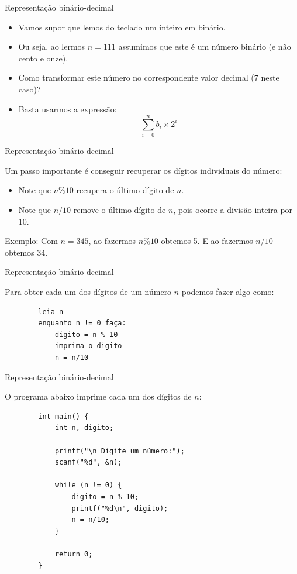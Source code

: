 \documentclass[handout]{beamer}
\begin{document}
\begin{frame}[fragile]{Representação binário-decimal}
    
    \begin{itemize}
        \item Vamos supor que lemos do teclado um inteiro em binário.
        \item Ou seja, ao lermos $n=111$ assumimos que este é um número binário (e não cento e onze).
        \item Como transformar este número no correspondente valor decimal (7 neste caso)?
        \item Basta usarmos a expressão:
            $$\sum_{i=0}^n b_i \times 2^i $$
    \end{itemize}
\end{frame}

\begin{frame}[fragile]{Representação binário-decimal}
    
    Um passo importante é conseguir recuperar os dígitos individuais do número:

    \begin{itemize}
        \item Note que $n\%10$ recupera o último dígito de $n$.
        \item Note que $n/10$ remove o último dígito de $n$, pois ocorre a divisão inteira por 10.
    \end{itemize}

    Exemplo: Com $n=345$, ao fazermos $n\%10$ obtemos 5. E ao fazermos $n/10$ obtemos 34.
\end{frame}

\begin{frame}[fragile]{Representação binário-decimal}
    
    Para obter cada um dos dígitos de um número $n$ podemos fazer algo como:
        
    \begin{verbatim}
        leia n
        enquanto n != 0 faça:
            digito = n % 10
            imprima o digito
            n = n/10
    \end{verbatim}
\end{frame}

\begin{frame}[fragile]{Representação binário-decimal}
    
    O programa abaixo imprime cada um dos dígitos de $n$:

    \begin{verbatim}
        int main() {
            int n, digito;

            printf("\n Digite um número:");
            scanf("%d", &n);

            while (n != 0) {
                digito = n % 10;
                printf("%d\n", digito);
                n = n/10;
            }

            return 0;
        }
    \end{verbatim}
\end{frame}
\end{document}
